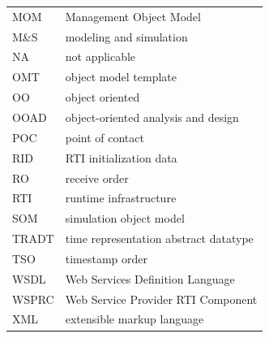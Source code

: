 \clearpage
\begin{tabular}{@{}p{0.95in}p{4.8in}@{}}
    MOM   & Management Object Model               \\
    M\&S  & modeling and simulation               \\
    NA    & not applicable                        \\
    OMT   & object model template                 \\
    OO    & object oriented                       \\
    OOAD  & object-oriented analysis and design   \\
    POC   & point of contact                      \\
    RID   & RTI initialization data               \\
    RO    & receive order                         \\
    RTI   & runtime infrastructure                \\
    SOM   & simulation object model               \\
    TRADT & time representation abstract datatype \\
    TSO   & timestamp order                       \\
    WSDL  & Web Services Definition Language      \\
    WSPRC & Web Service Provider RTI Component    \\
    XML   & extensible markup language            \\
\end{tabular}

\clearpage
\thispagestyle{body}
\null
\clearpage
